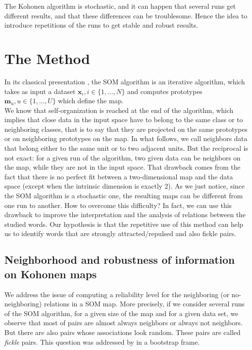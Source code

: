 \documentclass[preprint]{elsarticle}
\begin{document}
The Kohonen algorithm is stochastic, and it can  happen that several runs get different results, and that these differences can be troublesome. Hence the idea to introduce repetitions of the runs to get stable and robust results.



\section{The Method}\label{method}

In its classical presentation \cite{kohonen95,cottrell98}, the SOM algorithm is an iterative algorithm, which takes as input a dataset $\mathbf{x}_i, i\in\{1,\hdots,N\}$ and computes prototypes $\mathbf{m}_u, u\in\{1,\hdots,U\}$ which define the map.\\

We know that self-organization is reached at the end of the algorithm, which implies that close data in the input space have to belong to the same class or to neighboring classes, that is to say that they are projected on the same prototypes or on neighboring prototypes on the map. In what follows, we call neighbors data that belong either to the same unit or to two adjacent units. But the reciprocal is not exact: for a given run of the algorithm, two given data can be neighbors on the map, while they are not in the input space. That drawback comes from the fact that there is no perfect fit between a two-dimensional map and the data space (except when the intrinsic dimension is exactly 2). As we just notice, since the SOM algorithm is a stochastic one, the resulting maps can be different from one run to another. How to overcome this difficulty? In fact, we can use this drawback to improve the interpretation and the analysis of relations between the studied words. Our hypothesis is that the repetitive use of this method can help us to identify words that are strongly attracted/repulsed and also fickle pairs.

\subsection{Neighborhood and robustness of information on Kohonen maps}

We address the issue of computing a reliability level for the neighboring (or no-neighboring) relations in a SOM map. More precisely, if we consider several runs of the SOM algorithm, for a given size of the map and for a given data set, we observe that most of pairs are almost always neighbors or always not neighbors. But there are also pairs whose associations look random. These pairs are called \textit{fickle} pairs. This question was addressed by \cite{debodt02} in a bootstrap frame.\\
\end{document}
